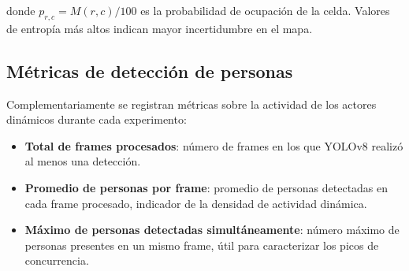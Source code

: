 donde $p_{r,c} = M(r,c) / 100$ es la probabilidad de ocupación de la celda.
Valores de entropía más altos indican mayor incertidumbre en el mapa.

\subsection{Métricas de detección de personas}

Complementariamente se registran métricas sobre la actividad de los actores
dinámicos durante cada experimento:

\begin{itemize}
    \item \textbf{Total de frames procesados}: número de frames en los que
          YOLOv8 realizó al menos una detección.
    \item \textbf{Promedio de personas por frame}: promedio de personas
          detectadas en cada frame procesado, indicador de la densidad de
          actividad dinámica.
    \item \textbf{Máximo de personas detectadas simultáneamente}: número máximo
          de personas presentes en un mismo frame, útil para caracterizar los
          picos de concurrencia.
\end{itemize}
